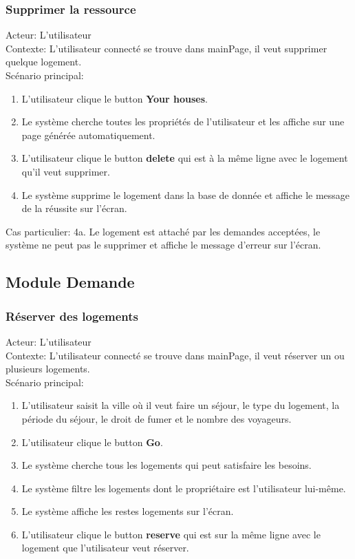 \documentclass[14px]{article}
\begin{document}
\subsubsection{Supprimer la ressource}
Acteur: L'utilisateur\\
Contexte: L'utilisateur connecté se trouve dans mainPage, il veut supprimer quelque logement.\\
Scénario principal:
\begin{enumerate}
	\item L'utilisateur clique le button \textbf{Your houses}.
	\item Le système cherche toutes les propriétés de l'utilisateur et les affiche sur une page générée automatiquement.
	\item L'utilisateur clique le button \textbf{delete} qui est à la même ligne avec le logement qu'il veut supprimer.
	\item Le système supprime le logement dans la base de donnée et affiche le message de la réussite sur l'écran.
\end{enumerate}
Cas particulier:
4a. Le logement est attaché par les demandes acceptées, le système ne peut pas le supprimer et affiche le message d'erreur sur l'écran.

\subsection{Module Demande}
\subsubsection{Réserver des logements}
Acteur: L'utilisateur\\
Contexte: L'utilisateur connecté se trouve dans mainPage, il veut réserver un ou plusieurs logements.\\
Scénario principal:
\begin{enumerate}
	\item L'utilisateur saisit la ville où il veut faire un séjour, le type du logement, la période du séjour, le droit de fumer et le nombre des voyageurs.
	\item L'utilisateur clique le button \textbf{Go}.
	\item Le système cherche tous les logements qui peut satisfaire les besoins.
	\item Le système filtre les logements dont le propriétaire est l'utilisateur lui-même.
	\item Le système affiche les restes logements sur l'écran.
	\item L'utilisateur clique le button \textbf{reserve} qui est sur la même ligne avec le logement que l'utilisateur veut réserver.
\end{enumerate}
\end{document}
